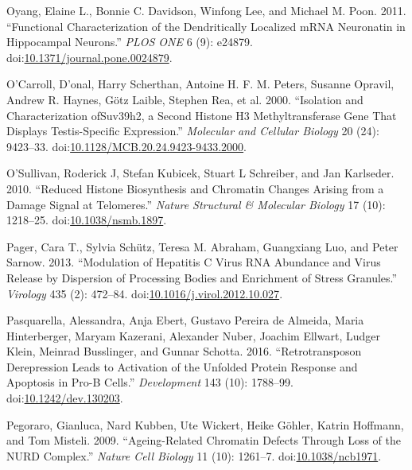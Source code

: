 \documentclass[onehalf,12pt]{beavtex}
\begin{document}
  \hypertarget{ref-OyangFunctionalCharacterizationDendritically2011}{}
  Oyang, Elaine L., Bonnie C. Davidson, Winfong Lee, and Michael M. Poon.
  2011. ``Functional Characterization of the Dendritically Localized mRNA
  Neuronatin in Hippocampal Neurons.'' \emph{PLOS ONE} 6 (9): e24879.
  doi:\href{https://doi.org/10.1371/journal.pone.0024879}{10.1371/journal.pone.0024879}.
  
  \hypertarget{ref-OCarrollIsolationCharacterizationofSuv39h22000}{}
  O'Carroll, D\a'onal, Harry Scherthan, Antoine H. F. M. Peters, Susanne
  Opravil, Andrew R. Haynes, Götz Laible, Stephen Rea, et al. 2000.
  ``Isolation and Characterization ofSuv39h2, a Second Histone H3
  Methyltransferase Gene That Displays Testis-Specific Expression.''
  \emph{Molecular and Cellular Biology} 20 (24): 9423--33.
  doi:\href{https://doi.org/10.1128/MCB.20.24.9423-9433.2000}{10.1128/MCB.20.24.9423-9433.2000}.
  
  \hypertarget{ref-OSullivanReducedhistonebiosynthesis2010}{}
  O'Sullivan, Roderick J, Stefan Kubicek, Stuart L Schreiber, and Jan
  Karlseder. 2010. ``Reduced Histone Biosynthesis and Chromatin Changes
  Arising from a Damage Signal at Telomeres.'' \emph{Nature Structural \&
  Molecular Biology} 17 (10): 1218--25.
  doi:\href{https://doi.org/10.1038/nsmb.1897}{10.1038/nsmb.1897}.
  
  \hypertarget{ref-PagerModulationhepatitisvirus2013}{}
  Pager, Cara T., Sylvia Schütz, Teresa M. Abraham, Guangxiang Luo, and
  Peter Sarnow. 2013. ``Modulation of Hepatitis C Virus RNA Abundance and
  Virus Release by Dispersion of Processing Bodies and Enrichment of
  Stress Granules.'' \emph{Virology} 435 (2): 472--84.
  doi:\href{https://doi.org/10.1016/j.virol.2012.10.027}{10.1016/j.virol.2012.10.027}.
  
  \hypertarget{ref-PasquarellaRetrotransposonderepressionleads2016a}{}
  Pasquarella, Alessandra, Anja Ebert, Gustavo Pereira de Almeida, Maria
  Hinterberger, Maryam Kazerani, Alexander Nuber, Joachim Ellwart, Ludger
  Klein, Meinrad Busslinger, and Gunnar Schotta. 2016. ``Retrotransposon
  Derepression Leads to Activation of the Unfolded Protein Response and
  Apoptosis in Pro-B Cells.'' \emph{Development} 143 (10): 1788--99.
  doi:\href{https://doi.org/10.1242/dev.130203}{10.1242/dev.130203}.
  
  \hypertarget{ref-PegoraroAgeingrelatedchromatindefects2009}{}
  Pegoraro, Gianluca, Nard Kubben, Ute Wickert, Heike Göhler, Katrin
  Hoffmann, and Tom Misteli. 2009. ``Ageing-Related Chromatin Defects
  Through Loss of the NURD Complex.'' \emph{Nature Cell Biology} 11 (10):
  1261--7. doi:\href{https://doi.org/10.1038/ncb1971}{10.1038/ncb1971}.
  
\end{document}
